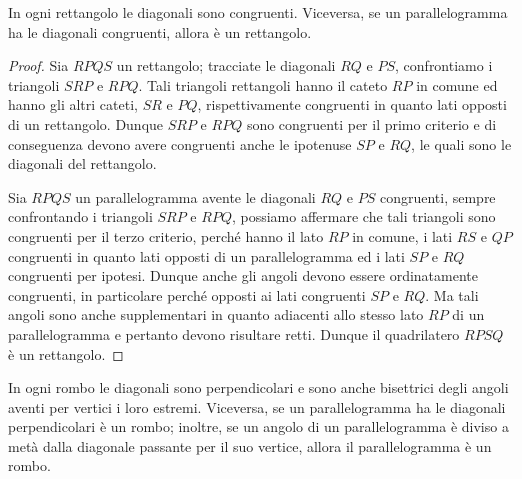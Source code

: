 \begin{teorema}
In ogni rettangolo le diagonali sono congruenti. Viceversa, se un parallelogramma ha le diagonali congruenti, allora è un rettangolo.
\end{teorema}

\begin{proof}
Sia $RPQS$ un rettangolo; tracciate le diagonali $RQ$ e $PS$, confrontiamo i triangoli $SRP$ e $RPQ$. Tali triangoli rettangoli hanno il cateto $RP$ in comune ed hanno gli altri cateti, $SR$ e $PQ$, rispettivamente congruenti in quanto lati opposti di un rettangolo. Dunque $SRP$ e $RPQ$ sono congruenti per il primo criterio e di conseguenza devono avere congruenti anche le ipotenuse $SP$ e $RQ$, le quali sono le diagonali del rettangolo.

Sia $RPQS$ un parallelogramma avente le diagonali $RQ$ e $PS$ congruenti, sempre confrontando i triangoli $SRP$ e $RPQ$, possiamo affermare che tali triangoli sono congruenti per il terzo criterio, perché hanno il lato $RP$ in comune, i lati $RS$ e $QP$ congruenti in quanto lati opposti di un parallelogramma ed i lati $SP$ e $RQ$ congruenti per ipotesi. Dunque anche gli angoli devono essere ordinatamente congruenti, in particolare  perché opposti ai lati congruenti $SP$ e $RQ$. Ma tali angoli sono anche supplementari in quanto adiacenti allo stesso lato $RP$ di un parallelogramma e pertanto devono risultare retti. Dunque il quadrilatero $RPSQ$ è un rettangolo.
\end{proof}

\begin{teorema}
In ogni rombo le diagonali sono perpendicolari e sono anche bisettrici degli angoli aventi per vertici i loro estremi. Viceversa, se un parallelogramma ha le diagonali perpendicolari è un rombo; inoltre, se un angolo di un parallelogramma è diviso a metà dalla diagonale passante per il suo vertice, allora il parallelogramma è un rombo.
\end{teorema}

